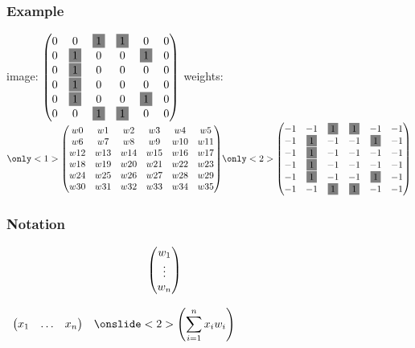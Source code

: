 \begin{frame}
  \frametitle{Example}
  image:
  \nolinebreak
  $
  \left(
    \begin{matrix}
      0 & 0 & \colorbox{gray}{1} & \colorbox{gray}{1} & 0 & 0 \\
      0 & \colorbox{gray}{1} & 0 & 0 & \colorbox{gray}{1} & 0 \\
      0 & \colorbox{gray}{1} & 0 & 0 & 0 & 0 \\
      0 & \colorbox{gray}{1} & 0 & 0 & 0 & 0 \\
      0 & \colorbox{gray}{1} & 0 & 0 & \colorbox{gray}{1} & 0 \\
      0 & 0 & \colorbox{gray}{1} & \colorbox{gray}{1} & 0 & 0
    \end{matrix}
  \right)
  $
  \newline
  weights:
  \nolinebreak
  $
  \only<1>{
    \left(
      \begin{matrix}
        w0 & w1 & w2 & w3 & w4 & w5 \\
        w6 & w7 & w8 & w9 & w10 & w11 \\
        w12 & w13 & w14 & w15 & w16 & w17 \\
        w18 & w19 & w20 & w21 & w22 & w23 \\
        w24 & w25 & w26 & w27 & w28 & w29 \\
        w30 & w31 & w32 & w33 & w34 & w35
      \end{matrix}
    \right)
  }
  \only<2>{
    \left(
    \begin{matrix}
      -1 & -1 & \colorbox{gray}{1} & \colorbox{gray}{1} & -1 & -1 \\
      -1 & \colorbox{gray}{1} & -1 & -1 & \colorbox{gray}{1} & -1 \\
      -1 & \colorbox{gray}{1} & -1 & -1 & -1 & -1 \\
      -1 & \colorbox{gray}{1} & -1 & -1 & -1 & -1 \\
      -1 & \colorbox{gray}{1} & -1 & -1 & \colorbox{gray}{1} & -1 \\
      -1 & -1 & \colorbox{gray}{1} & \colorbox{gray}{1} & -1 & -1
    \end{matrix}
    \right)
  }
  $
\end{frame}

\begin{frame}
  \frametitle{Notation}
  $
  \begin{array}{cc}
    &
    \left(
      \begin{matrix}
        w_1 \\
        \vdots \\
        w_n
      \end{matrix}
    \right) \\
    &\\
    \left(
      \begin{matrix}
        x_1 & \ldots & x_{n}
      \end{matrix}
    \right) & \onslide<2>{\left( \displaystyle\sum_{i = 1}^n{x_i w_i} \right)}
  \end{array}
  $
\end{frame}

